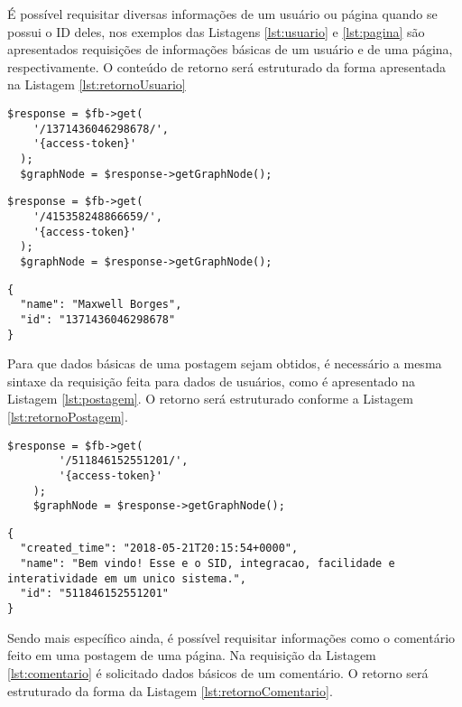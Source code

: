 É possível requisitar diversas informações de um usuário ou página quando se possui o ID deles, nos exemplos das Listagens \ref{lst:usuario} e \ref{lst:pagina} são apresentados requisições de informações básicas de um usuário e de uma página, respectivamente. O conteúdo de retorno será estruturado da forma apresentada na Listagem \ref{lst:retornoUsuario}  

\begin{lstlisting}[caption={Requisitar informações de um usuário específico},label={lst:usuario}]
  $response = $fb->get(
    '/1371436046298678/',
    '{access-token}'
  );
  $graphNode = $response->getGraphNode();
\end{lstlisting}

\begin{lstlisting}[caption={Requisitar informações de uma página},label={lst:pagina}]
  $response = $fb->get(
    '/415358248866659/',
    '{access-token}'
  );
  $graphNode = $response->getGraphNode();
\end{lstlisting}

\begin{lstlisting}[caption={Resposta do servidor as requisições \ref{lst:me}, \ref{lst:usuario} e \ref{lst:pagina}},label={lst:retornoUsuario}]
{
  "name": "Maxwell Borges",
  "id": "1371436046298678"
}
\end{lstlisting}

Para que dados básicas de uma postagem sejam obtidos, é necessário a mesma sintaxe da requisição feita para dados de usuários, como é apresentado na Listagem \ref{lst:postagem}. O retorno será estruturado conforme a Listagem \ref{lst:retornoPostagem}.

\begin{lstlisting}[caption={Requisitar informações de uma postagem específica},label={lst:postagem}]
    $response = $fb->get(
        '/511846152551201/',
        '{access-token}'
    );
    $graphNode = $response->getGraphNode();
\end{lstlisting}

\begin{lstlisting}[caption={Resposta do servidor a requisição \ref{lst:postagem}},label={lst:retornoPostagem}]
{
  "created_time": "2018-05-21T20:15:54+0000",
  "name": "Bem vindo! Esse e o SID, integracao, facilidade e interatividade em um unico sistema.",
  "id": "511846152551201"
}
\end{lstlisting}

Sendo mais específico ainda, é possível requisitar informações como o comentário feito em uma postagem de uma página. Na requisição da Listagem \ref{lst:comentario} é solicitado dados básicos de um comentário. O retorno será estruturado da forma da Listagem \ref{lst:retornoComentario}.

